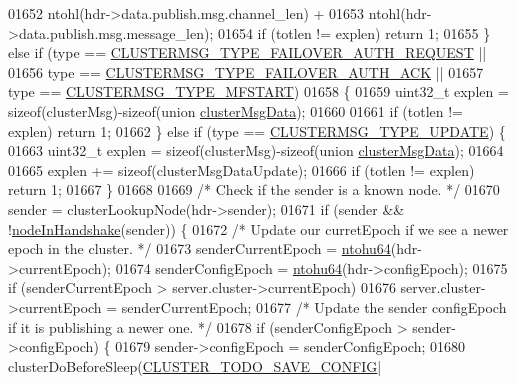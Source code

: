 \begin{DoxyCode}
{{{{{{{{{{{{{{{{{{{{{{{01652                 ntohl(hdr->data.publish.msg.channel\_len) +
01653                 ntohl(hdr->data.publish.msg.message\_len);
01654         \textcolor{keywordflow}{if} (totlen != explen) \textcolor{keywordflow}{return} 1;
01655     \} \textcolor{keywordflow}{else} \textcolor{keywordflow}{if} (type == \hyperlink{cluster_8h_a739009308ed4cb5b19630a5f872408d2}{CLUSTERMSG\_TYPE\_FAILOVER\_AUTH\_REQUEST} ||
01656                type == \hyperlink{cluster_8h_ae0db3a998d7da521c5359bdd8708f5f6}{CLUSTERMSG\_TYPE\_FAILOVER\_AUTH\_ACK} ||
01657                type == \hyperlink{cluster_8h_aa875273b4b11ae73d3cd3a8aea4ddcba}{CLUSTERMSG\_TYPE\_MFSTART})
01658     \{
01659         uint32\_t explen = \textcolor{keyword}{sizeof}(clusterMsg)-\textcolor{keyword}{sizeof}(\textcolor{keyword}{union} \hyperlink{unionclusterMsgData}{clusterMsgData});
01660 
01661         \textcolor{keywordflow}{if} (totlen != explen) \textcolor{keywordflow}{return} 1;
01662     \} \textcolor{keywordflow}{else} \textcolor{keywordflow}{if} (type == \hyperlink{cluster_8h_a51dc58bb78128fcae1751d654130ec0f}{CLUSTERMSG\_TYPE\_UPDATE}) \{
01663         uint32\_t explen = \textcolor{keyword}{sizeof}(clusterMsg)-\textcolor{keyword}{sizeof}(\textcolor{keyword}{union} \hyperlink{unionclusterMsgData}{clusterMsgData});
01664 
01665         explen += \textcolor{keyword}{sizeof}(clusterMsgDataUpdate);
01666         \textcolor{keywordflow}{if} (totlen != explen) \textcolor{keywordflow}{return} 1;
01667     \}
01668 
01669     \textcolor{comment}{/* Check if the sender is a known node. */}
01670     sender = clusterLookupNode(hdr->sender);
01671     \textcolor{keywordflow}{if} (sender && !\hyperlink{cluster_8h_a70f1a5bb82f54ce5d17b13de42176790}{nodeInHandshake}(sender)) \{
01672         \textcolor{comment}{/* Update our curretEpoch if we see a newer epoch in the cluster. */}
01673         senderCurrentEpoch = \hyperlink{endianconv_8h_ab6e7416a2faac85cd6d50180e7348a1b}{ntohu64}(hdr->currentEpoch);
01674         senderConfigEpoch = \hyperlink{endianconv_8h_ab6e7416a2faac85cd6d50180e7348a1b}{ntohu64}(hdr->configEpoch);
01675         \textcolor{keywordflow}{if} (senderCurrentEpoch > server.cluster->currentEpoch)
01676             server.cluster->currentEpoch = senderCurrentEpoch;
01677         \textcolor{comment}{/* Update the sender configEpoch if it is publishing a newer one. */}
01678         \textcolor{keywordflow}{if} (senderConfigEpoch > sender->configEpoch) \{
01679             sender->configEpoch = senderConfigEpoch;
01680             clusterDoBeforeSleep(\hyperlink{cluster_8h_a0ae5ff08fbae3c655012b4de8bfc327d}{CLUSTER\_TODO\_SAVE\_CONFIG}|
}}}}}}}}}}}}}}}}}}}}}}}
\end{DoxyCode}
